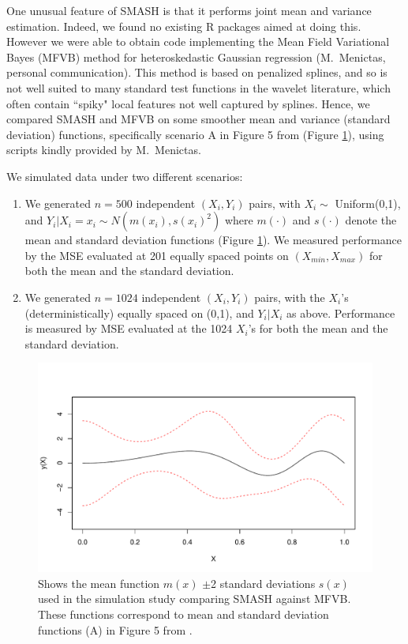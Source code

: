 \documentclass[12pt]{article}
\begin{document}
One unusual feature of SMASH is that it performs joint mean and variance estimation.
Indeed, we found no existing R packages aimed at doing this. However we were able to obtain code
implementing the Mean Field Variational Bayes (MFVB) method for heteroskedastic Gaussian regression \cite{Menictas2015Variational} (M.~Menictas, personal communication). 
This method is based on penalized splines, and so is not well suited to many standard test functions in the wavelet literature, which
often contain ``spiky" local features not well captured by splines. Hence, we compared SMASH and MFVB on some
smoother mean and variance (standard deviation) functions, specifically scenario A in Figure 5 from \cite{Menictas2015Variational} (Figure \ref{fig:mfvb_eg}),
using scripts kindly provided by M.~Menictas.

We simulated data under two different scenarios:
\begin{enumerate}
\item We generated $n=500$ independent $(X_i,Y_i)$ pairs, with $X_i \sim$ Uniform(0,1), and $Y_i | X_i=x_i \sim N(m(x_i),s(x_i)^2)$
where $m(\cdot)$ and $s(\cdot)$ denote the mean and standard deviation functions (Figure \ref{fig:mfvb_eg}). We measured performance by the MSE 
evaluated at 201 equally spaced points on $(X_{min},X_{max})$ for both the mean and the standard deviation.
\item We generated $n=1024$ independent $(X_i,Y_i)$ pairs, with the $X_i$'s (deterministically) equally spaced on (0,1), and $Y_i|X_i$ as above. Performance is measured by MSE evaluated at the 1024 $X_i$'s for both the mean and the standard deviation.
\end{enumerate}
\begin{figure}[ht]
    \centering
    \includegraphics[width=\textwidth]{mfvb_eg.pdf}
    \caption{Shows the mean function $m(x)$ $\pm$2 standard deviations $s(x)$ used in the simulation study comparing SMASH against MFVB. These functions correspond to mean and standard deviation functions (A) in Figure 5 from \cite{Menictas2015Variational}.}
    \label{fig:mfvb_eg}
\end{figure}
\end{document}
